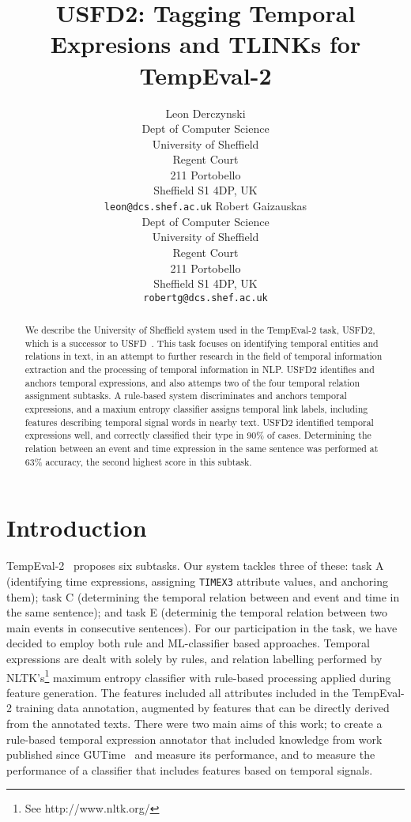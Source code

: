 \documentclass[11pt]{article}
\title{USFD2: Tagging Temporal Expresions and TLINKs for TempEval-2}
\author{Leon Derczynski\\
  Dept of Computer Science\\ 
  University of Sheffield\\ 
  Regent Court\\
  211 Portobello\\ 
  Sheffield S1 4DP, UK\\ 
  {\tt leon@dcs.shef.ac.uk} \And
  Robert Gaizauskas\\
  Dept of Computer Science\\
  University of Sheffield\\
  Regent Court\\
  211 Portobello\\
  Sheffield S1 4DP, UK\\
  {\tt robertg@dcs.shef.ac.uk}
}
\date{}
\begin{document}
\maketitle
\begin{abstract}
We describe the University of Sheffield system used in the TempEval-2 task, USFD2, which is a successor to USFD~\cite{hepple2007usfd}. This task focuses on identifying temporal entities and relations in text, in an attempt to further research in the field of temporal information extraction and the processing of temporal information in NLP. USFD2 identifies and anchors temporal expressions, and also attemps two of the four temporal relation assignment subtasks. A rule-based system discriminates and anchors temporal expressions, and a maxium entropy classifier assigns temporal link labels, including features describing temporal signal words in nearby text. USFD2 identified temporal expressions well, and correctly classified their type in 90\% of cases. Determining the relation between an event and time expression in the same sentence was performed at 63\% accuracy, the second highest score in this subtask.
\end{abstract}

\section{Introduction}
TempEval-2~\cite{pustejovsky2009semeval} proposes six subtasks. Our system tackles three of these: task A (identifying time expressions, assigning {\tt TIMEX3} attribute values, and anchoring them); task C (determining the temporal relation between and event and time in the same sentence); and task E (determinig the temporal relation between two main events in consecutive sentences). For our participation in the task, we have decided to employ both rule and ML-classifier based approaches. Temporal expressions are dealt with solely by rules, and relation labelling performed by NLTK's\footnote{See http://www.nltk.org/} maximum entropy classifier with rule-based processing applied during feature generation. The features included all attributes included in the TempEval-2 training data annotation, augmented by features that can be directly derived from the annotated texts. There were two main aims of this work; to create a rule-based temporal expression annotator that included knowledge from work published since GUTime~\cite{mani2000robust} and measure its performance, and to measure the performance of a classifier that includes features based on temporal signals.
\end{document}
